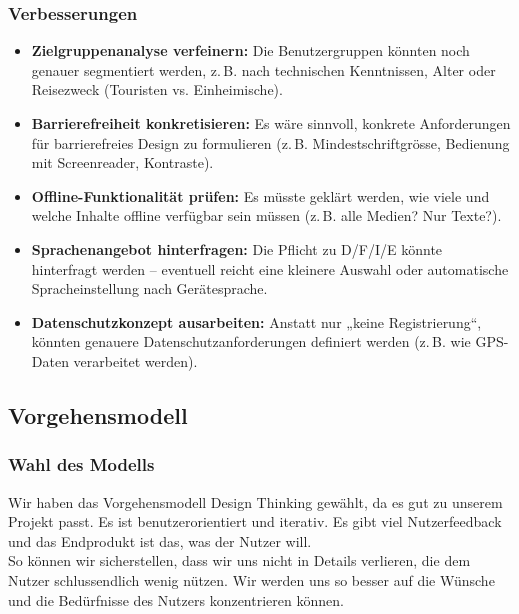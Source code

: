 \documentclass[10pt]{article}
\begin{document}
	\subsubsection[Verbesserungen]{Verbesserungen}
		\begin{itemize}
			\item \textbf{Zielgruppenanalyse verfeinern:} Die Benutzergruppen könnten noch genauer segmentiert werden, z.\,B. nach technischen Kenntnissen, Alter oder Reisezweck (Touristen vs. Einheimische).
			\item \textbf{Barrierefreiheit konkretisieren:} Es wäre sinnvoll, konkrete Anforderungen für barrierefreies Design zu formulieren (z.\,B. Mindestschriftgrösse, Bedienung mit Screenreader, Kontraste).
			\item \textbf{Offline-Funktionalität prüfen:} Es müsste geklärt werden, wie viele und welche Inhalte offline verfügbar sein müssen (z.\,B. alle Medien? Nur Texte?).
			\item \textbf{Sprachenangebot hinterfragen:} Die Pflicht zu D/F/I/E könnte hinterfragt werden – eventuell reicht eine kleinere Auswahl oder automatische Spracheinstellung nach Gerätesprache.
			\item \textbf{Datenschutzkonzept ausarbeiten:} Anstatt nur „keine Registrierung“, könnten genauere Datenschutzanforderungen definiert werden (z.\,B. wie GPS-Daten verarbeitet werden).
		\end{itemize}
		\pagebreak
	\subsection{Vorgehensmodell}
		\subsubsection{Wahl des Modells}
		Wir haben das Vorgehensmodell Design Thinking gewählt, da es gut zu unserem Projekt passt. Es ist benutzerorientiert und iterativ. Es gibt viel Nutzerfeedback und das Endprodukt ist das, was der Nutzer will.\\
		So können wir sicherstellen, dass wir uns nicht in Details verlieren, die dem Nutzer schlussendlich wenig nützen. Wir werden uns so besser auf die Wünsche und die Bedürfnisse des Nutzers konzentrieren können.
\end{document}
